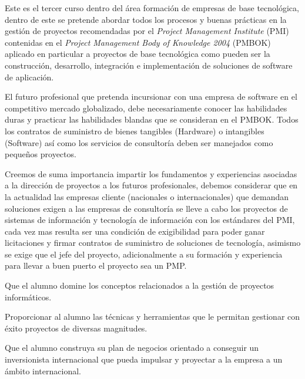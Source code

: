 \begin{syllabus}


\begin{justification}
   Este es el tercer curso dentro del área formación de empresas de base tecnológica, 
   dentro de este se pretende abordar todos los procesos y buenas prácticas en la 
   gestión de proyectos recomendadas por el \textit{Project Management Institute} (PMI) 
   contenidas en el \textit{Project Management Body of Knowledge 2004} (PMBOK)  
   aplicado en particular a proyectos de base tecnológica como pueden ser la 
   construcción, desarrollo, integración e implementación de soluciones de 
   software de aplicación.
   
   El futuro profesional que pretenda incursionar con una empresa de 
   software en el competitivo mercado globalizado, debe necesariamente 
   conocer las habilidades duras y practicar las habilidades blandas que se 
   consideran en el PMBOK. Todos los contratos de suministro de bienes 
   tangibles (Hardware) o intangibles (Software) así como los servicios de 
   consultoría deben ser manejados como pequeños proyectos.
   
   Creemos de suma importancia impartir los fundamentos y experiencias 
   asociadas a la dirección de proyectos a los futuros profesionales, 
   debemos considerar que en la actualidad las empresas cliente 
   (nacionales o internacionales) que demandan soluciones exigen a 
   las empresas de consultoría se lleve a cabo los proyectos de sistemas 
   de información y tecnología de información con los estándares del PMI, 
   cada vez mas resulta ser una condición de exigibilidad para poder ganar 
   licitaciones y firmar contratos de suministro de soluciones de tecnología, 
   asimismo se exige que el jefe del proyecto, adicionalmente a su formación y 
   experiencia para llevar a buen puerto el proyecto sea un PMP.
   \end{justification}
   
   \begin{goals}
   \item Que el alumno domine los conceptos relacionados a la gestión de proyectos informáticos.
   \item Proporcionar al alumno las técnicas y herramientas que le permitan gestionar con éxito proyectos de diversas magnitudes.
   \item Que el alumno construya su plan de negocios orientado a conseguir un inversionista internacional que pueda impulsar y proyectar a la empresa a un ámbito internacional.
   \end{goals}
   

\end{syllabus}
